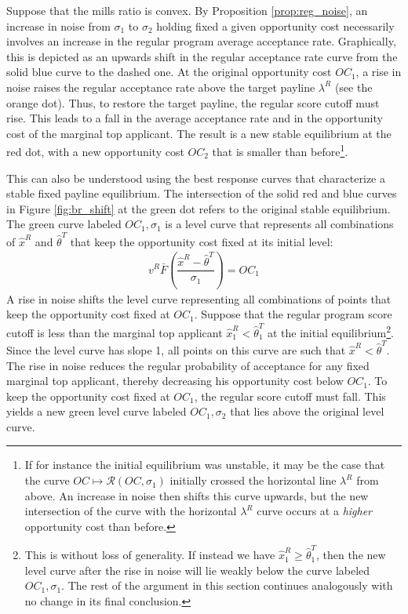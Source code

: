\documentclass[12pt,reqno]{amsart}
\theoremstyle{definition}
\theoremstyle{plain} %
\begin{document}
\noindent Suppose that the mills ratio is convex. By Proposition \ref{prop:reg_noise}, an increase in noise from $\sigma_1$ to $\sigma_2$ holding fixed a given opportunity cost necessarily involves an increase in the regular program average acceptance rate. Graphically, this is depicted as an upwards shift in the regular acceptance rate curve from the solid blue curve to the dashed one. At the original opportunity cost $OC_1$, a rise in noise raises the regular acceptance rate above the target payline $\lambda^R$ (see the orange dot). Thus, to restore the target payline, the regular score cutoff must rise. This leads to a fall in the average acceptance rate and in the opportunity cost of the marginal top applicant. The result is a new stable equilibrium at the red dot, with a new opportunity cost $OC_2$ that is smaller than before\footnote{If for instance the initial equilibrium was unstable, it may be the case that the curve $OC\mapsto \mathcal{R}(OC,\sigma_1)$ initially crossed the horizontal line $\lambda^R$ from above. An increase in noise then shifts this curve upwards, but the new intersection of the curve with the horizontal $\lambda^R$ curve occurs at a \textit{higher} opportunity cost than before.}. 



% 

\noindent This can also be understood using the best response curves that characterize a stable fixed payline equilibrium. The intersection of the solid red and blue curves in Figure \ref{fig:br_shift} at the green dot refers to the original stable equilibrium. The green curve labeled $OC_1,\sigma_1$ is a level curve that represents all combinations of $\hat{x}^R$ and $\hat{\theta}^T$ that keep the opportunity cost fixed at its initial level:
\begin{align*}
    v^R\bar{F}\left(\dfrac{\hat{x}^R - \hat{\theta}^T}{\sigma_1}\right) = OC_1
\end{align*}
A rise in noise shifts the level curve representing all combinations of points that keep the opportunity cost fixed at $OC_1$. Suppose that the regular program score cutoff is less than the marginal top applicant $\hat{x}_1^R < \hat{\theta}_1^T$ at the initial equilibrium\footnote{This is without loss of generality. If instead we have $\hat{x}_1^R \geq \hat{\theta}_1^T$, then the new level curve after the rise in noise will lie weakly below the curve labeled $OC_1,\sigma_1$. The rest of the argument in this section continues analogously with no change in its final conclusion.}. Since the level curve has slope 1, all points on this curve are such that $\hat{x}^R < \hat{\theta}^T$. The rise in noise reduces the regular probability of acceptance for any fixed marginal top applicant, thereby decreasing his opportunity cost below $OC_1$. To keep the opportunity cost fixed at $OC_1$, the regular score cutoff must fall. This yields a new green level curve labeled $OC_1,\sigma_2$ that lies above the original level curve.
\end{document}
